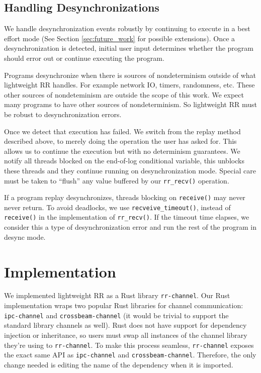 \documentclass{article}
\begin{document}
\subsection{Handling Desynchronizations}
\label{sec:handle_desync}
We handle desynchronization events robustly by continuing to execute in
a best effort mode (See Section \ref{sec:future_work} for possible extensions).
Once a desynchronization is detected, initial user input determines whether the
program should error out or continue executing the program.

Programs desynchronize when there is sources of nondeterminism outside of what lightweight
RR handles. For example network IO, timers, randomness, etc. These
other sources of nondeteminism are outside the scope of this work. We expect many
programs to have other sources of nondeterminism. So lightweight RR must be robust to
desynchronization errors.

Once we detect that execution has failed. We switch from the replay method described
above, to merely doing the operation the user has asked for. This allows us to
continue the execution but with no determinism guarantees. We notify all threads
blocked on the end-of-log conditional variable, this unblocks these threads and
they continue running on desynchronization mode. Special care must be taken to
``flush'' any value buffered by our \texttt{rr\_recv()} operation.

If a program replay desynchronizes, threads blocking on \texttt{receive()} may never never
return. To avoid deadlocks, we use \texttt{recveive\_timeout()}, instead of \texttt{receive()}
in the implementation of \texttt{rr\_recv()}. If the timeout time elapses, we consider this
a type of desynchronization error and run the rest of the program in desync mode.

\section{Implementation}
We implemented lightweight RR as a Rust library \texttt{rr-channel}. Our Rust implementation
wraps two popular Rust libraries
for channel communication: \texttt{ipc-channel} and \texttt{crossbeam-channel} (it would be
trivial to support the standard library channels as well). Rust does not have
support for dependency injection or inheritance, so users must swap all instances of the
channel library they're using to \texttt{rr-channel}. To make this process seamless,
\texttt{rr-channel} exposes the exact same API as \texttt{ipc-channel} and
\texttt{crossbeam-channel}. Therefore, the only change needed is editing the name of the
dependency when it is imported.
\end{document}
